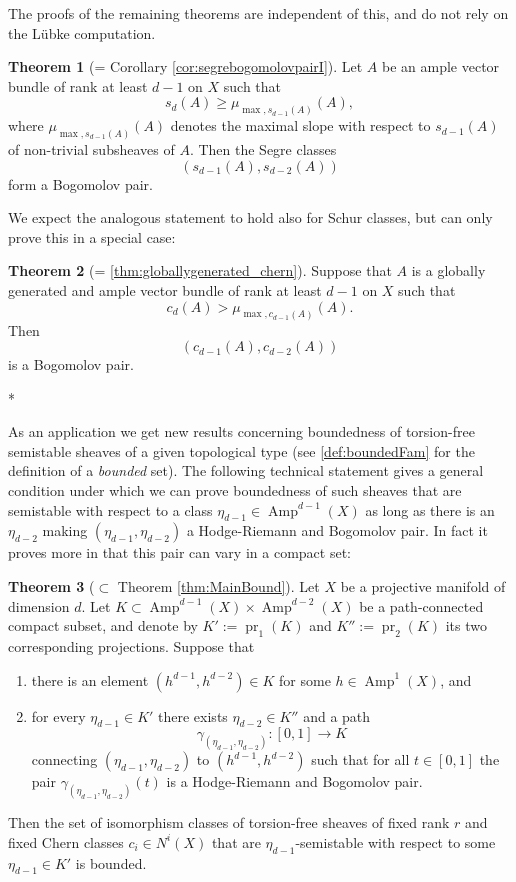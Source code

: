 \documentclass[a4,reqno]{amsart}
\theoremstyle{definition}
\newtheorem{theorem}{Theorem}[section]
\DeclareMathOperator{\Amp}{Amp}
\DeclareMathOperator{\pr}{pr}
\numberwithin{equation}{section}
\begin{document}
The proofs of the remaining theorems are independent of this, and do not rely on the L\"ubke computation.


\begin{theorem}[= Corollary \ref{cor:segrebogomolovpairI}]\label{cor:segrebogomolovpair:intro}
Let $A$ be an ample vector bundle of rank at least $d-1$ on $X$ such that
\[
    s_d(A) \ge \mu_{\max, s_{d-1}(A)}(A),
\]
where $\mu_{\max,s_{d-1}(A)}(A)$ denotes the maximal slope with respect to $s_{d-1}(A)$ of non-trivial subsheaves of $A$. Then the Segre classes $$(s_{d-1}(A),s_{d-2}(A))$$ form a Bogomolov pair.
\end{theorem}

We expect the analogous statement to hold also for Schur classes, but can only prove this in a special case:


\begin{theorem}[= \cref{thm:globallygenerated_chern}]\label{thm:globallygeneratedintro_chern}
Suppose that $A$ is a globally generated and ample vector bundle of rank at least $d-1$ on $X$ such that
\[
    c_d(A) > \mu_{\max, c_{d-1}(A)}(A).
\]
Then
$$(c_{d-1}(A),c_{d-2}(A))$$
is a Bogomolov pair.
\end{theorem}

\begin{center}
*
\end{center}


As an application we get new results concerning boundedness of torsion-free semistable sheaves of a given topological type (see \cref{def:boundedFam} for the definition of a \textit{bounded} set). The following technical statement gives a general condition under which we can prove boundedness of such sheaves that are semistable with respect to a class $\eta_{d-1} \in \Amp^{d-1}(X)$ as long as there is an $\eta_{d-2}$ making $(\eta_{d-1},\eta_{d-2})$ a Hodge-Riemann and Bogomolov pair. In fact it proves more in that this pair can vary in a compact set:


\begin{theorem}[$\subset$ Theorem \ref{thm:MainBound}]
Let $X$ be a projective manifold of dimension $d$. Let $K \subset \Amp^{d-1}(X) \times \Amp^{d-2}(X)$ be a path-connected compact subset, and denote by $K' := \pr_1(K)$ and $K'' := \pr_2(K)$ its two corresponding projections. Suppose that
\begin{enumerate}
    \item there is an element $(h^{d-1},h^{d-2})\in K$ for some $h\in \Amp^1(X)$, and
    \item for every $\eta_{d-1} \in K'$ there exists $\eta_{d-2} \in K''$ and a path $$\gamma_{(\eta_{d-1},\eta_{d-2})} : [0,1] \to K$$ connecting $(\eta_{d-1},\eta_{d-2})$ to $(h^{d-1},h^{d-2})$ such that for all $t \in [0,1]$ the pair $\gamma_{(\eta_{d-1},\eta_{d-2})}(t)$ is a Hodge-Riemann and Bogomolov pair. 
\end{enumerate}
Then the set of isomorphism classes of torsion-free sheaves of fixed rank $r$ and fixed Chern classes $c_i \in N^i(X)$  that are $\eta_{d-1}$-semistable with respect to some $\eta_{d-1}\in K'$ is bounded.
\end{theorem}
\end{document}

